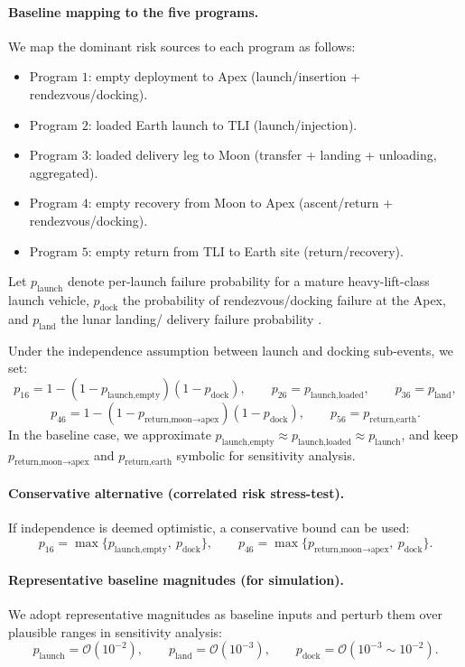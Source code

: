 ﻿\documentclass{mcmthesis}
\begin{document}
\paragraph{Baseline mapping to the five programs.}
We map the dominant risk sources to each program as follows:
\begin{itemize}
    \item Program $1$: empty deployment to Apex (launch/insertion + rendezvous/docking).
    \item Program $2$: loaded Earth launch to TLI (launch/injection).
    \item Program $3$: loaded delivery leg to Moon (transfer + landing + unloading, aggregated).
    \item Program $4$: empty recovery from Moon to Apex (ascent/return + rendezvous/docking).
    \item Program $5$: empty return from TLI to Earth site (return/recovery).
\end{itemize}

Let $p_{\text{launch}}$ denote per-launch failure probability for a mature heavy-lift-class launch vehicle,
$p_{\text{dock}}$ the probability of rendezvous/docking failure at the Apex, and $p_{\text{land}}$ the lunar landing/
delivery failure probability \cite{nasa_launch_reliability,nasa_docking,nasa_landing}.

Under the independence assumption between launch and docking sub-events, we set:
\[
p_{16} = 1-(1-p_{\text{launch,empty}})(1-p_{\text{dock}}),
\qquad
p_{26} = p_{\text{launch,loaded}},
\qquad
p_{36} = p_{\text{land}},
\]
\[
p_{46} = 1-(1-p_{\text{return,moon}\rightarrow \text{apex}})(1-p_{\text{dock}}),
\qquad
p_{56} = p_{\text{return,earth}}.
\]
In the baseline case, we approximate $p_{\text{launch,empty}}\approx p_{\text{launch,loaded}}\approx p_{\text{launch}}$,
and keep $p_{\text{return,moon}\rightarrow \text{apex}}$ and $p_{\text{return,earth}}$ symbolic for sensitivity analysis.

\paragraph{Conservative alternative (correlated risk stress-test).}
If independence is deemed optimistic, a conservative bound can be used:
\[
p_{16} = \max\{p_{\text{launch,empty}},\ p_{\text{dock}}\},\qquad
p_{46} = \max\{p_{\text{return,moon}\rightarrow \text{apex}},\ p_{\text{dock}}\}.
\]

\paragraph{Representative baseline magnitudes (for simulation).}
We adopt representative magnitudes as baseline inputs and perturb them over plausible ranges in sensitivity analysis:
\[
p_{\text{launch}}=\mathcal{O}(10^{-2}),\qquad
p_{\text{land}}=\mathcal{O}(10^{-3}),\qquad
p_{\text{dock}}=\mathcal{O}(10^{-3}\sim 10^{-2}).
\]
\end{document}
